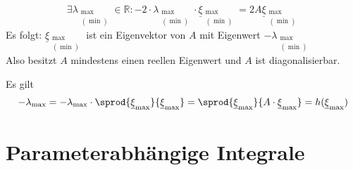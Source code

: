 \begin{enumerate}[(i)]
	\[
		\exists  \lambda_{\substack{\max \\ (\min)}} \in \mathds{R} : -2 \cdot \lambda_{\substack{\max \\ (\min)}} \cdot \underline{\xi}_{\substack{\max \\ (\min)}} = 2 A 
		\underline{\xi}_{\substack{\max \\ (\min)}}
	\]
	Es folgt: $\underline{\xi}_{\substack{\max \\ (\min)}}$ ist ein Eigenvektor von $A$ mit Eigenwert $- \lambda_{\substack{\max \\ (\min)}}$ \\
	Also besitzt $A$ mindestens einen reellen Eigenwert und $A$ ist diagonalisierbar.
	
	Es gilt 
	\[
		- \lambda_{\max} = - \lambda_{\max} \cdot \sprod{\underline{\xi}_{\max}}{\underline{\xi}_{\max}} = \sprod{\underline{\xi}_{\max}}{A \cdot \underline{\xi}_{\max}} 
		= h(\underline{\xi}_{\max})
	\]
\end{enumerate}
\newpage

\section{Parameterabhängige Integrale} %
\label{sec:9}

